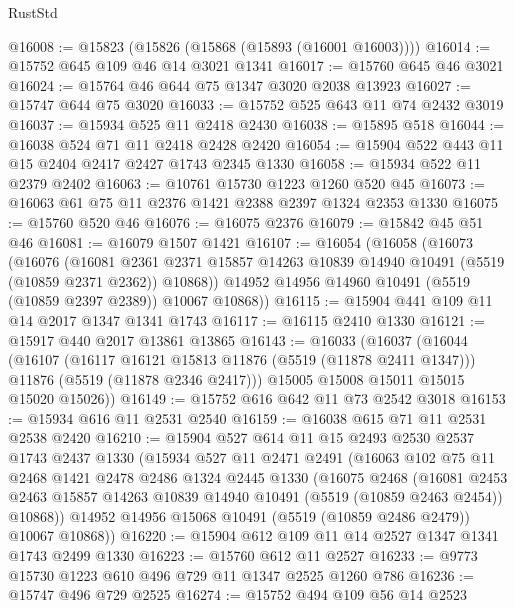 \begin{lexlean}{RustStd}
\begin{coremodule}
@16008 := @15823 (@15826 (@15868 (@15893 (@16001 @16003))))
@16014 := @15752 @645 @109 @46 @14 @3021 @1341
@16017 := @15760 @645 @46 @3021
@16024 := @15764 @46 @644 @75 @1347 @3020 @2038 @13923
@16027 := @15747 @644 @75 @3020
@16033 := @15752 @525 @643 @11 @74 @2432 @3019
@16037 := @15934 @525 @11 @2418 @2430
@16038 := @15895 @518
@16044 := @16038 @524 @71 @11 @2418 @2428 @2420
@16054 := @15904 @522 @443 @11 @15 @2404 @2417 @2427 @1743 @2345 @1330
@16058 := @15934 @522 @11 @2379 @2402
@16063 := @10761 @15730 @1223 @1260 @520 @45
@16073 := @16063 @61 @75 @11 @2376 @1421 @2388 @2397 @1324 @2353 @1330
@16075 := @15760 @520 @46
@16076 := @16075 @2376
@16079 := @15842 @45 @51 @46
@16081 := @16079 @1507 @1421
@16107 := @16054
    (@16058
      (@16073
        (@16076
          (@16081
            @2361
            @2371
            @15857
            @14263
            @10839
            @14940
            @10491
            (@5519 (@10859 @2371 @2362))
            @10868))
        @14952
        @14956
        @14960
        @10491
        (@5519 (@10859 @2397 @2389))
        @10067
        @10868))
@16115 := @15904 @441 @109 @11 @14 @2017 @1347 @1341 @1743
@16117 := @16115 @2410 @1330
@16121 := @15917 @440 @2017 @13861 @13865
@16143 := @16033
    (@16037
      (@16044
        (@16107
          (@16117 @16121 @15813 @11876 (@5519 (@11878 @2411 @1347)))
          @11876
          (@5519 (@11878 @2346 @2417)))
        @15005
        @15008
        @15011
        @15015
        @15020
        @15026))
@16149 := @15752 @616 @642 @11 @73 @2542 @3018
@16153 := @15934 @616 @11 @2531 @2540
@16159 := @16038 @615 @71 @11 @2531 @2538 @2420
@16210 := @15904
    @527
    @614
    @11
    @15
    @2493
    @2530
    @2537
    @1743
    @2437
    @1330
    (@15934
      @527
      @11
      @2471
      @2491
      (@16063
        @102
        @75
        @11
        @2468
        @1421
        @2478
        @2486
        @1324
        @2445
        @1330
        (@16075
          @2468
          (@16081
            @2453
            @2463
            @15857
            @14263
            @10839
            @14940
            @10491
            (@5519 (@10859 @2463 @2454))
            @10868))
        @14952
        @14956
        @15068
        @10491
        (@5519 (@10859 @2486 @2479))
        @10067
        @10868))
@16220 := @15904 @612 @109 @11 @14 @2527 @1347 @1341 @1743 @2499 @1330
@16223 := @15760 @612 @11 @2527
@16233 := @9773 @15730 @1223 @610 @496 @729 @11 @1347 @2525 @1260 @786
@16236 := @15747 @496 @729 @2525
@16274 := @15752
    @494
    @109
    @56
    @14
    @2523

\end{coremodule}
\end{lexlean}
